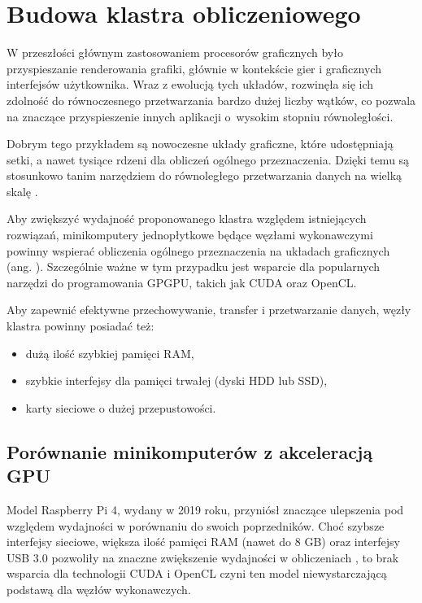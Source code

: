 \chapter{Budowa klastra obliczeniowego} \label{ch:budowa-klastra}

W przeszłości głównym zastosowaniem procesorów graficznych było przyspieszanie renderowania
grafiki, głównie w kontekście gier i graficznych interfejsów użytkownika. Wraz z ewolucją
tych układów, rozwinęła się ich zdolność do równoczesnego przetwarzania bardzo dużej liczby
wątków, co pozwala na znaczące przyspieszenie innych aplikacji o~wysokim stopniu równoległości.

Dobrym tego przykładem są nowoczesne układy graficzne, które udostępniają setki, a nawet
tysiące rdzeni dla obliczeń ogólnego przeznaczenia. Dzięki temu są stosunkowo tanim
narzędziem do równoległego przetwarzania danych na wielką skalę \cite{computer-arch}.

Aby zwiększyć wydajność proponowanego klastra względem istniejących rozwiązań, minikomputery
jednopłytkowe będące węzłami wykonawczymi powinny wspierać obliczenia ogólnego przeznaczenia
na układach graficznych (ang. ).
Szczególnie ważne w tym przypadku jest wsparcie dla popularnych narzędzi do programowania
GPGPU, takich jak CUDA oraz OpenCL.

Aby zapewnić efektywne przechowywanie, transfer i przetwarzanie danych, węzły klastra
powinny posiadać też:
\begin{itemize}
	\item dużą ilość szybkiej pamięci RAM,
	\item szybkie interfejsy dla pamięci trwałej (dyski HDD lub SSD),
	\item karty sieciowe o dużej przepustowości.
\end{itemize}

\section{Porównanie minikomputerów z akceleracją GPU}

Model Raspberry Pi 4, wydany w 2019 roku, przyniósł znaczące ulepszenia pod względem wydajności
w porównaniu do swoich poprzedników. Choć szybsze interfejsy sieciowe, większa ilość pamięci RAM
(nawet do 8 GB) oraz interfejsy USB 3.0 pozwoliły na znaczne zwiększenie wydajności w obliczeniach
 \cite{rpi-cluster-2}, to brak wsparcia dla technologii CUDA i OpenCL czyni ten
model niewystarczającą podstawą dla węzłów wykonawczych.

